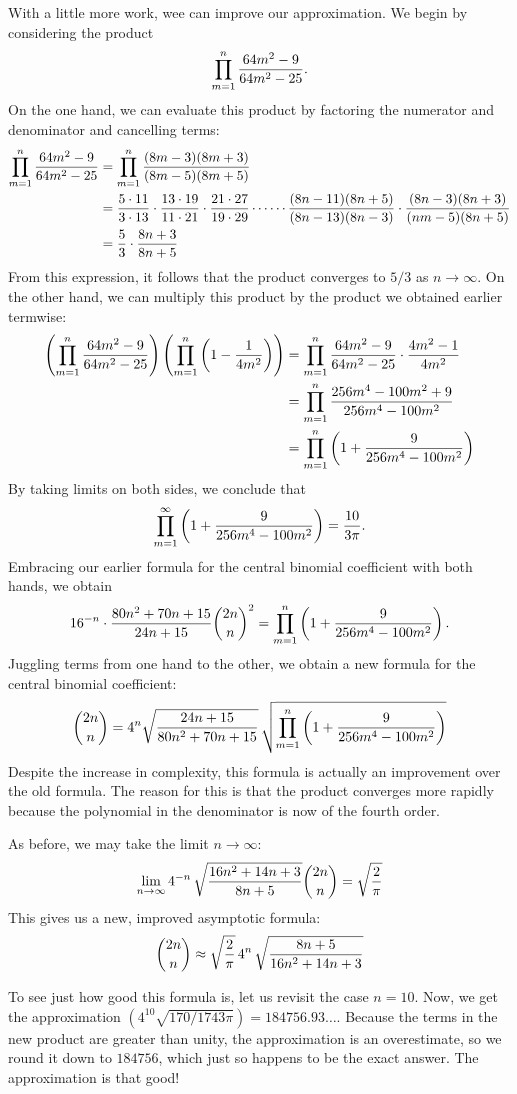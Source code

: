 \documentclass[12pt]{article}
\begin{document}
With a little more work, wee can improve our approximation.
We begin by considering the product
\[
 \prod_{m=1}^n  {64 m^2 - 9 \over 64 m^2 - 25} .
\]
On the one hand, we can evaluate this product by factoring 
the numerator and denominator and cancelling terms:
\begin{align*}
 \prod_{m=1}^n {64 m^2 - 9 \over 64 m^2 - 25} &=
 \prod_{m=1}^n {(8m-3)(8m+3) \over (8m-5)(8m+5)} \\ &=
 {5 \cdot 11 \over 3 \cdot 13} \cdot
 {13 \cdot 19 \over 11 \cdot 21} \cdot
 {21 \cdot 27 \over 19 \cdot 29}
 \cdots \cdots
 {(8n-11)(8n+5) \over (8n-13)(8n-3)} \cdot
 {(8n-3)(8n+3) \over (nm-5)(8n+5)} \\ &=
 {5 \over 3} \cdot {8n+3 \over 8n+5}
\end{align*}
From this expression, it follows that the product converges
to $5/3$ as $n \to \infty$.
On the other hand, we can multiply this product by the product
we obtained earlier termwise:
\begin{align*}
 \left( 
  \prod_{m=1}^n {64 m^2 - 9 \over 64 m^2 - 25} 
 \right)
 \left( 
  \prod_{m=1}^n 
    \left( 1 - {1 \over 4 m^2} \right)
 \right) &=
 \prod_{m=1}^n
  {64 m^2 - 9 \over 64 m^2 - 25} \cdot
  {4 m^2 - 1 \over 4 m^2} \\ &=
 \prod_{m=1}^n
  {256 m^4 - 100 m^2 + 9 \over 256 m^4 - 100 m^2} \\ &=
 \prod_{m=1}^n
  \left(
   1 + {9 \over 256 m^4 - 100 m^2}
  \right)
\end{align*}
By taking limits on both sides, we conclude that
\[
  \prod_{m=1}^\infty
  \left(
   1 + {9 \over 256 m^4 - 100 m^2}
  \right) =
 {10 \over 3 \pi} .
\]
Embracing our earlier formula for the central binomial
coefficient with both hands, we obtain
\[
 16^{-n} \cdot
  {80 n^2 + 70 n + 15 \over 24 n + 15} 
  {2n \choose n}^2 =
 \prod_{m=1}^n
  \left(
   1 + {9 \over 256 m^4 - 100 m^2}
  \right) .
\]
Juggling terms from one hand to the other, we obtain
a new formula for the central binomial coefficient:
\[
 {2n \choose n} =
 4^n 
  \sqrt{24 n + 15 \over 80 n^2 + 70 n + 15} \,
  \sqrt{
   \prod_{m=1}^n
    \left(
     1 + {9 \over 256 m^4 - 100 m^2}
    \right)}
\]
Despite the increase in complexity, this formula is
actually an improvement over the old formula.  The reason
for this is that the product converges more rapidly
because the polynomial in the denominator is now
of the fourth order.

As before, we may take the limit $n \to \infty$:
\[
 \lim_{n \to \infty}
  4^{-n} \,
  \sqrt{16 n^2 + 14 n + 3 \over 8 n + 5} 
  {2n \choose n} =
 \sqrt{2 \over \pi}
\]
This gives us a new, improved asymptotic formula:
\[
 {2n \choose n} \approx
 \sqrt{2 \over \pi} \,
  4^n \,
  \sqrt{8 n + 5 \over 16 n^2 + 14 n + 3}
\]

To see just how good this formula is, let us revisit 
the case $n=10$.  Now, we get the approximation 
$(4^{10} \sqrt{170/1743\pi}) = 184756.93\ldots$.
Because the terms in the new product are greater
than unity, the approximation is an overestimate,
so we round it down to $184756$, which just so
happens to be the exact answer.  The approximation
is that good!
\end{document}

